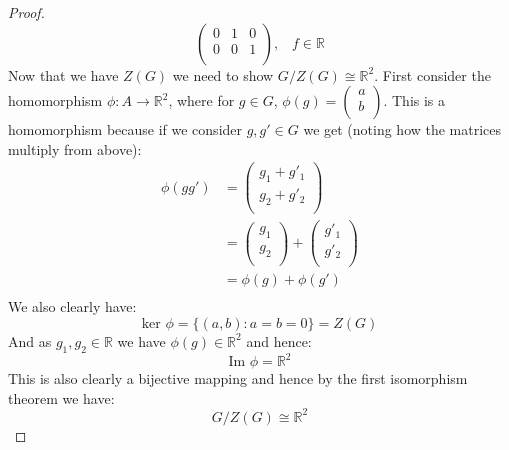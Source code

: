 \documentclass{article}
\begin{document}
\begin{proof}
$$\begin{pmatrix}
0 & 1 & 0\\
0 & 0 & 1\\
\end{pmatrix}, \;\;\; f\in\mathbb{R}$$
Now that we have $Z(G)$ we need to show $G/Z(G)\cong\mathbb{R}^2$. First consider the homomorphism $\phi: A\rightarrow\mathbb{R}^2$, where for $g\in G$, $\phi(g)=\begin{pmatrix}
a\\
b\\
\end{pmatrix}$. This is a homomorphism because if we consider $g,g'\in G$ we get (noting how the matrices multiply from above):
\begin{align*}
\phi(gg')&=\begin{pmatrix}
g_1+g'_1\\
g_2+g'_2\\
\end{pmatrix}\\
&=\begin{pmatrix}
g_1\\
g_2\\
\end{pmatrix}+\begin{pmatrix}
g'_1\\
g'_2\\
\end{pmatrix}\\
&=\phi(g)+\phi(g')\\
\end{align*}
We also clearly have:
$$\text{ker }\phi=\{(a,b):a=b=0\}=Z(G)$$
And as $g_1,g_2\in\mathbb{R}$ we have $\phi(g)\in\mathbb{R}^2$ and hence:
$$\text{Im }\phi=\mathbb{R}^2$$
This is also clearly a bijective mapping and hence by the first isomorphism theorem we have:
$$G/Z(G)\cong\mathbb{R}^2$$
\end{proof}
\end{document}
